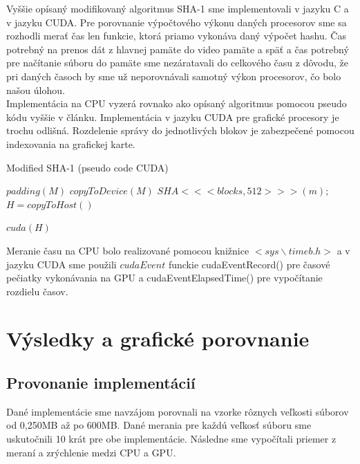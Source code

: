 \documentclass[conference]{IEEEtran}
\begin{document}
Vyššie opísaný modifikovaný algoritmus SHA-1 sme implementovali v jazyku C a v jazyku CUDA. Pre porovnanie výpočtového výkonu daných procesorov sme sa rozhodli merať čas len funkcie, ktorá priamo vykonáva daný výpočet hashu. Čas potrebný na prenos dát z hlavnej pamäte do video pamäte a späť a čas potrebný pre načítanie súboru do pamäte sme nezáratavali do celkového času z dôvodu, že pri daných časoch by sme už neporovnávali samotný výkon procesorov, čo bolo našou úlohou.\\
Implementácia na CPU vyzerá rovnako ako opísaný algoritmus pomocou pseudo kódu vyššie v článku. Implementácia v jazyku CUDA pre grafické procesory je trochu odlišná. Rozdelenie správy do jednotlivých blokov je zabezpečené pomocou indexovania na grafickej karte.

\begin{algorithm}
   \caption{Modified SHA-1 (pseudo code CUDA)}
    \begin{algorithmic}[1]
        	\State ${padding(M)}$ 
        	\State ${copyToDevice(M)}$ 
     	\State ${SHA<<< blocks, 512 >>> (m);}$ 
     	\State ${H = copyToHost()}$ 	
   	
   	 ${cuda(H)}$
   	\EndIf
       \EndFunction
\end{algorithmic}
\end{algorithm}

Meranie času na CPU bolo realizované pomocou knižnice ${<sys\backslash timeb.h>}$ a v jazyku CUDA sme použili ${cudaEvent}$ funckie cudaEventRecord() pre časové pečiatky vykonávania na GPU a cudaEventElapsedTime() pre vypočítanie rozdielu časov. 


\section{Výsledky a grafické porovnanie}

\subsection{Provonanie implementácií}
Dané implementácie sme navzájom porovnali na vzorke rôznych veľkosti súborov od 0,250MB až po 600MB. Dané merania pre každú veľkosť súboru sme uskutočnili 10 krát pre obe implementácie. Následne sme vypočítali priemer z meraní a zrýchlenie medzi CPU a GPU. 
\end{document}
